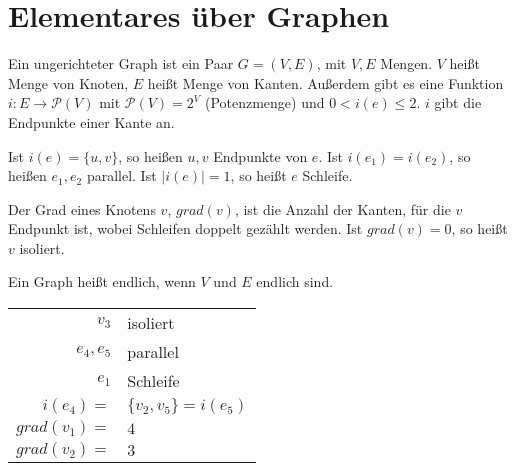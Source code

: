 
\section{Elementares über Graphen}


\begin{definition}
	
	Ein ungerichteter Graph ist ein Paar $G = (V,E)$, mit $V, E$ Mengen. $V$ heißt Menge von Knoten, $E$ heißt Menge von Kanten. Außerdem gibt es eine Funktion $i: E \rightarrow \mathcal{P}(V)$ mit $\mathcal{P}(V) = 2^V$ (Potenzmenge) und $0 < i(e) \leq 2$. $i$ gibt die Endpunkte einer Kante an.
	
	Ist $i(e) = \{ u, v \}$, so heißen $u, v$ Endpunkte von $e$. Ist $i(e_1) = i(e_2)$, so heißen $e_1, e_2$ parallel. Ist $|i(e)| = 1$, so heißt $e$ Schleife.
	
	Der Grad eines Knotens $v$, $grad(v)$, ist die Anzahl der Kanten, für die $v$ Endpunkt ist, wobei Schleifen doppelt gezählt werden. Ist $grad(v) = 0$, so heißt $v$ isoliert.
	
	Ein Graph heißt endlich, wenn $V$ und $E$ endlich sind.
\end{definition}


\begin{beispiel}
	\qquad
	\vspace{2mm}
	
	\begin{minipage}{8cm}
	\end{minipage}
	\begin{minipage}{5cm}	
	\begin{tabular}[t]{rl}
		$v_3$ & isoliert \\
		$e_4, e_5$ & parallel \\
		$e_1$ & Schleife \\
		$i(e_4) =$& $ \{ v_2, v_5 \} = i(e_5)$\\
		$grad(v_1) =$& $4$ \\
		$grad(v_2) =$& $3$ \\
	\end{tabular}
	\end{minipage}
\end{beispiel}


